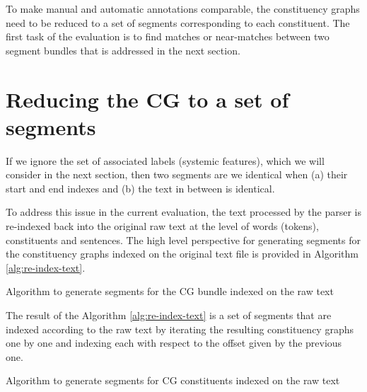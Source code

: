 To make manual and automatic annotations comparable, the constituency graphs need to be reduced to a set of segments corresponding to each constituent. The first task of the evaluation is to find matches or near-matches between two segment bundles that is addressed in the next section.


\section{Reducing the CG to a set of segments}
\label{sec:segment-alignment}
If we ignore the set of associated labels (systemic features), which we will consider in the next section, then two segments are we identical when (a) their start and end indexes and (b) the text in between is identical. 

To address this issue in the current evaluation, the text processed by the parser is re-indexed back into the original raw text at the level of words (tokens), constituents and sentences. The high level perspective for generating segments for the constituency graphs indexed on the original text file is provided in Algorithm \ref{alg:re-index-text}.

\begin{algorithm}[!ht]
    \caption{Algorithm to generate segments for the CG bundle indexed on the raw text}
    \label{alg:re-index-text}
\end{algorithm}

The result of the Algorithm \ref{alg:re-index-text} is a set of segments that are indexed according to the raw text by iterating the resulting constituency graphs one by one and indexing each with respect to the offset given by the previous one. 

\begin{algorithm}[!ht]
    \caption{Algorithm to generate segments for CG constituents indexed on the raw text}
    \label{alg:re-index-words-and-cg}
\end{algorithm}

